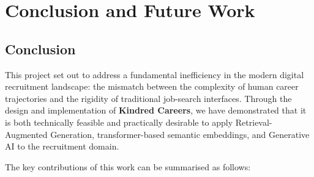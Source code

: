 \documentclass[12pt, a4paper, oneside]{report}
\begin{document}
\chapter{Conclusion and Future Work}

\section{Conclusion}
\label{sec:conclusion}

This project set out to address a fundamental inefficiency in the modern digital recruitment
landscape: the mismatch between the complexity of human career trajectories and the
rigidity of traditional job-search interfaces. Through the design and implementation of
\textbf{Kindred Careers}, we have demonstrated that it is both technically feasible and
practically desirable to apply Retrieval-Augmented Generation, transformer-based semantic
embeddings, and Generative AI to the recruitment domain.

The key contributions of this work can be summarised as follows:
\end{document}

